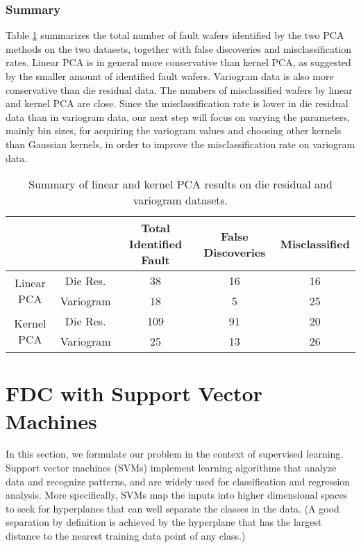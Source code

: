\documentclass[english]{article}
\numberwithin{equation}{section}
\numberwithin{table}{section}
\numberwithin{figure}{section}
\begin{document}
\subsubsection{Summary}

Table \ref{tab:Summary-of-linear} summarizes the total number of
fault wafers identified by the two PCA methods on the two datasets,
together with false discoveries and misclassification rates. Linear
PCA is in general more conservative than kernel PCA, as suggested
by the smaller amount of identified fault wafers. Variogram data is
also more conservative than die residual data. The numbers of misclassified
wafers by linear and kernel PCA are close. Since the misclassification
rate is lower in die residual data than in variogram data, our next
step will focus on varying the parameters, mainly bin sizes, for acquiring
the variogram values and choosing other kernels than Gaussian kernels,
in order to improve the misclassification rate on variogram data.

\begin{table}[!tph]
\caption{Summary of linear and kernel PCA results on die residual and variogram
datasets. \label{tab:Summary-of-linear}}
\begin{centering}
\begin{tabular}{|c|c|c|c|c|}
\hline 
 &  & Total Identified Fault & False Discoveries & Misclassified\tabularnewline
\hline 
\multirow{2}{*}{Linear PCA} & Die Res. & 38 & 16 & 16\tabularnewline
\cline{2-5} 
 & Variogram & 18 & 5 & 25\tabularnewline
\hline 
\multirow{2}{*}{Kernel PCA} & Die Res. & 109 & 91 & 20\tabularnewline
\cline{2-5} 
 & Variogram & 25 & 13 & 26\tabularnewline
\hline 
\end{tabular}
\par\end{centering}

\end{table}



\section{FDC with Support Vector Machines} \label{svm}
\hspace{12 pt}
In this section, we formulate our problem in the context of supervised
learning. Support vector machines (SVMs) implement learning algorithms
that analyze data and recognize patterns, and are widely used for
classification and regression analysis. More specifically, SVMs map
the inputs into higher dimensional spaces to seek for hyperplanes
that can well separate the classes in the data. (A good separation
by definition is achieved by the hyperplane that has the largest distance
to the nearest training data point of any class.\cite{libsvm})
\end{document}
